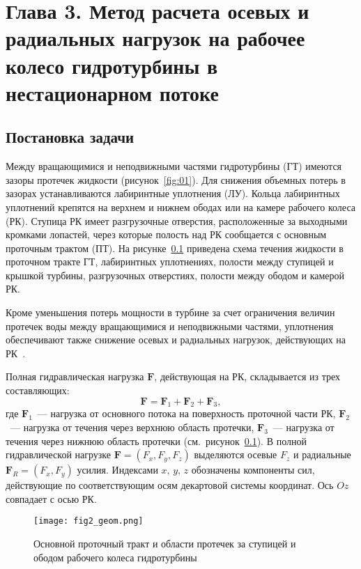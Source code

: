 \chapter*{Глава 3. Метод расчета осевых и радиальных нагрузок на рабочее колесо гидротурбины 
в нестационарном потоке}
\label{s:3}
\setcounter{chapter}{3}
\setcounter{section}{0}

% 
% 
%

\section{Постановка задачи}
\label{s:31}
Между вращающимися и неподвижными частями гидротурбины (ГТ) имеются зазоры протечек жидкости 
(рисунок~\ref{fig:01}). Для снижения объемных потерь в зазорах устанавливаются лабиринтные
уплотнения (ЛУ). Кольца лабиринтных уплотнений крепятся на верхнем и нижнем ободах или на камере рабочего 
колеса (РК). Ступица РК имеет разгрузочные отверстия, расположенные за выходными кромками лопастей, через 
которые полость над РК сообщается с основным проточным трактом (ПТ). На рисунке~\ref{fig3:2} приведена
схема течения жидкости в проточном тракте ГТ, лабиринтных уплотнениях, полости между ступицей и крышкой 
турбины, разгрузочных отверстиях, полости между ободом и камерой РК.

Кроме уменьшения потерь мощности в турбине за счет ограничения величин протечек воды между вращающимися и 
неподвижными частями, уплотнения обеспечивают также снижение осевых и радиальных нагрузок, действующих 
на РК~\cite{granovsky}.

Полная гидравлическая нагрузка $\textbf{F}$, действующая на РК, складывается из трех составляющих:
\begin{equation}
  \textbf{F} = \textbf{F}_1 + \textbf{F}_2 + \textbf{F}_3,
  \label{eq3:1}
\end{equation}
где $\textbf{F}_1$~--- нагрузка от основного потока на поверхность проточной части РК, $\textbf{F}_2$~--- 
нагрузка от течения через верхнюю область протечки, $\textbf{F}_3$~--- нагрузка от течения
через нижнюю область протечки (см.~рисунок~\ref{fig3:2}). В полной гидравлической 
нагрузке $\textbf{F}=(F_x,F_y,F_z)$ выделяются осевые $F_z$ и радиальные $\textbf{F}_R=(F_x,F_y)$ усилия. 
Индексами $x,\, y,\, z$ обозначены компоненты сил, действующие по соответствующим осям декартовой системы 
координат. Ось $Oz$ совпадает с осью РК.
\begin{figure}[t!]
  \centering
  \texttt{[image: fig2\_geom.png]}
  \caption{Основной проточный тракт и области протечек за ступицей и ободом рабочего колеса гидротурбины}
  \label{fig3:2}
\end{figure}

